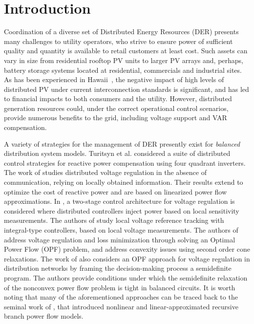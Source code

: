 \section{Introduction}

Coordination of a diverse set of Distributed Energy Resources (DER) presents many challenges to utility operators, who strive to ensure power of sufficient quality and quantity is available to retail customers at least cost.  Such assets can vary in size from residential rooftop PV units to larger PV arrays and, perhaps, battery storage systems located at residential, commercials and industrial sites.  As has been experienced in Hawaii~\cite{stewart2013analysis}, the negative impact of high levels of distributed PV under current interconnection standards is significant, and has led to financial impacts to both consumers and the utility.  However, distributed generation resources could, under the correct operational control scenarios, provide numerous benefits to the grid, including voltage support and VAR compensation.  

A variety of strategies for the management of DER presently exist for \emph{balanced} distribution system models.  Turitsyn et al. \cite{turitsyn2011options} considered a suite of distributed control strategies for reactive power compensation using four quadrant inverters.  The work of \cite{li2014real} studies distributed voltage regulation in the absence of communication, relying on locally obtained information.  Their results extend to optimize the cost of reactive power and are based on linearized power flow approximations.  In \cite{robbins2013two}, a two-stage control architecture for voltage regulation is considered where distributed controllers inject power based on local sensitivity measurements.  The authors of \cite{zhang2013local} study local voltage reference tracking with integral-type controllers, based on local voltage measurements.  The authors of \cite{farivar2011inverter} address voltage regulation and loss minimization through solving an Optimal Power Flow (OPF) problem, and address convexity issues using second order cone relaxations.  The work of \cite{lam2012optimal} also considers an OPF approach for voltage regulation in distribution networks by framing the decision-making process a semidefinite program.  The authors provide conditions under which the semidefinite relaxation of the nonconvex power flow problem is tight in balanced circuits. It is worth noting that many of the aforementioned approaches can be traced back to the seminal work of \cite{baran1989optimal}, that introduced nonlinear and linear-approximated recursive branch power flow models.

